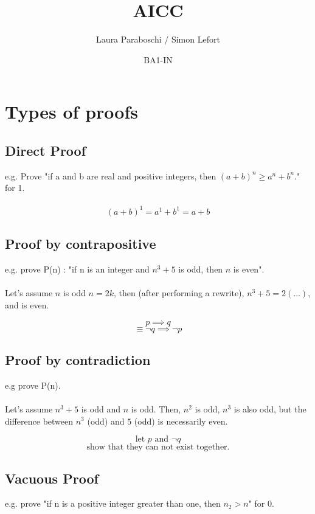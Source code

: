 \documentclass{article}
\title{AICC}
\author{Laura Paraboschi / Simon Lefort}
\date{BA1-IN}
\begin{document}
\maketitle

\section{Types of proofs}

\subsection{Direct Proof}

e.g. Prove "if a and b are real and positive integers, then $ (a+b)^{n} \geq a^{n} + b^{n} $." for 1. \\ \\
\[ (a+b)^1 = a^1 + b^1 = a + b \]

\subsection{Proof by contrapositive}

e.g. prove P(n) : "if n is an integer and $ n^{3} + 5 $ is odd, then $ n $ is even". \\ \\
Let's assume $ n $ is odd $ n = 2k $, then (after performing a rewrite), $ n^3 + 5 = 2(...) $, and is even.

\[ p \implies q \]
\[ \equiv \neg{q} \implies \neg{p} \]

\subsection{Proof by contradiction}

e.g prove P(n). \\ \\
Let's assume $ n^3 + 5 $ is odd and $ n $ is odd. Then, $ n^2 $ is odd, $ n^3 $ is also odd, but the difference between $ n^3 $ (odd) and $ 5 $ (odd) is necessarily even.

\[ \text{let } p \text{ and } \neg{q} \]
\[ \text{show that they can not exist together.} \]

\subsection{Vacuous Proof}

e.g. prove "if n is a positive integer greater than one, then $n_{2} > n $" for 0.
\end{document}
